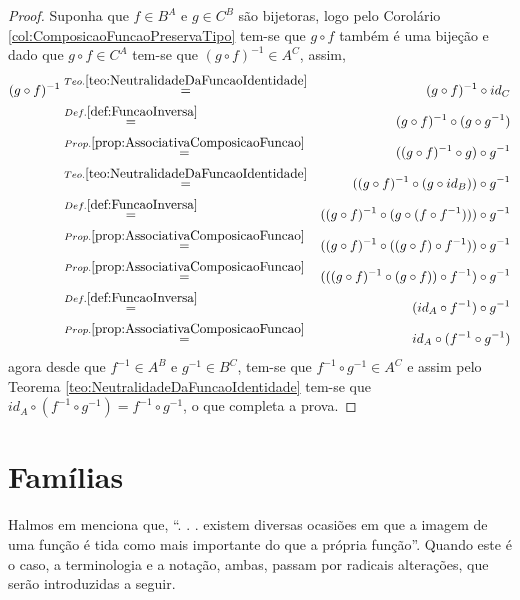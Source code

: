 \begin{proof}
	Suponha que $f \in B^A$ e $g \in C^B$ são bijetoras, logo pelo Corolário \ref{col:ComposicaoFuncaoPreservaTipo} tem-se que $g \circ f$ também é uma bijeção e dado que $g \circ f \in C^A$ tem-se que $(g \circ f)^{-1} \in A^C$, assim,
	\begin{eqnarray*}
		(g \circ f)^{-1} & \stackrel{Teo. \ref{teo:NeutralidadeDaFuncaoIdentidade}}{=} &  (g \circ f)^{-1} \circ id_C\\
		& \stackrel{Def. \ref{def:FuncaoInversa}}{=} & (g \circ f)^{-1} \circ (g \circ g^{-1})\\
		& \stackrel{Prop. \ref{prop:AssociativaComposicaoFuncao}}{=} & ((g \circ f)^{-1} \circ g) \circ g^{-1}\\
		& \stackrel{Teo. \ref{teo:NeutralidadeDaFuncaoIdentidade}}{=} & ((g \circ f)^{-1} \circ (g \circ id_B)) \circ g^{-1}\\
		& \stackrel{Def. \ref{def:FuncaoInversa}}{=} & ((g \circ f)^{-1} \circ (g \circ (f \circ f^{-1}))) \circ g^{-1}\\
		& \stackrel{Prop. \ref{prop:AssociativaComposicaoFuncao}}{=} & ((g \circ f)^{-1} \circ ((g \circ f) \circ f^{-1})) \circ g^{-1}\\
		& \stackrel{Prop. \ref{prop:AssociativaComposicaoFuncao}}{=} & (((g \circ f)^{-1} \circ (g \circ f)) \circ f^{-1}) \circ g^{-1}\\
		& \stackrel{Def. \ref{def:FuncaoInversa}}{=} & (id_A \circ f^{-1}) \circ g^{-1}\\
		& \stackrel{Prop. \ref{prop:AssociativaComposicaoFuncao}}{=} & id_A \circ (f^{-1} \circ g^{-1})
	\end{eqnarray*}
	agora desde que $f^{-1} \in A^B$ e $g^{-1} \in B^C$, tem-se que $f^{-1} \circ g^{-1} \in A^C$ e assim pelo Teorema \ref{teo:NeutralidadeDaFuncaoIdentidade} tem-se que $id_A \circ (f^{-1} \circ g^{-1}) = f^{-1} \circ g^{-1}$, o que completa a prova.
\end{proof}

\section{Famílias}

Halmos em \cite{halmos2001} menciona que, ``. . . existem diversas ocasiões em que a imagem de uma função é tida como mais importante do que a própria função''. Quando este é o caso, a terminologia e a notação, ambas, passam por radicais alterações, que serão introduzidas a seguir.

